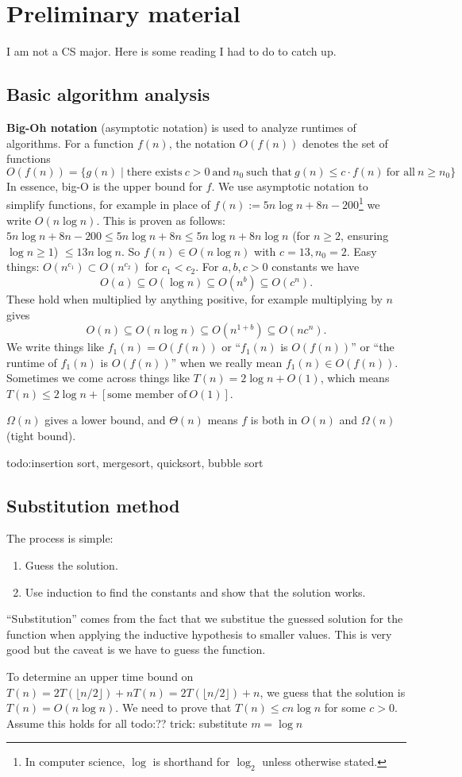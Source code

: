 \section{Preliminary material} 
I am not a CS major. Here is some reading I had to do to catch up.
\subsection{Basic algorithm analysis}
\textbf{Big-Oh notation} (asymptotic notation) is used to analyze runtimes of algorithms. For a function $f(n)$, the notation $O(f(n))$ denotes the set of functions \[
    O(f(n))= \{g(n) \mid \text{there exists} \ c>0 \ \text{and} \ n_0 \ \text{such that} \ g(n) \leq c \cdot f(n) \ \text{for all} \ n \geq n_0\} 
\] 
In essence, big-O is the upper bound for $f$. We use asymptotic notation to simplify functions, for example in place of $f(n):=5n \log n+8n -200$\footnote{In computer science, $\log$ is shorthand for $\log_2$ unless otherwise stated.} we write $O(n \log n)$. This is proven as follows: $5n \log n +8n-200 \leq 5n \log n + 8n \leq 5n \log n +8 n \log n$ (for $n\geq 2$, ensuring $\log n \geq 1$) $\leq 13 n \log n$. So $f(n) \in O(n \log n)$ with $c=13, n_0=2$. Easy things: $O(n ^{c_1}) \subset O (n ^{c_2})$ for $c_1 < c_2$. For $a,b,c>0$ constants we have \[
    O(a) \subseteq  O( \log n) \subseteq O(n^b) \subseteq O(c^n).
\] These hold when multiplied by anything positive, for example multiplying by $n$ gives \[
O(n) \subseteq O(n \log n) \subseteq O(n^{1+b}) \subseteq O(n c^n ).
\] We write things like $f_1(n)=O(f(n))$ or ``$f_1(n)$ is $O(f(n))$'' or ``the runtime of $f_1(n)$ is $O(f(n))$'' when we really mean $f_1(n) \in O(f(n))$. Sometimes we come across things like $T(n)=2 \log n +O(1)$, which means $T(n) \leq 2 \log n + [\text{some member of} \ O(1)]$.

$\Omega(n)$ gives a lower bound, and $\Theta(n)$ means $f$ is both in $O(n)$ and $\Omega(n)$ (tight bound).

{\color{red}todo:insertion sort, mergesort, quicksort, bubble sort} 

\subsection{Substitution method}
The process is simple:
\begin{enumerate}[label=(\arabic*)]
\setlength\itemsep{-.2em}
    \item Guess the solution.
    \item Use induction to find the constants and show that the solution works.
\end{enumerate}
``Substitution'' comes from the fact that we substitue the guessed solution for the function when applying the inductive hypothesis to smaller values. This is very good but the caveat is we have to guess the function.
\begin{example}
    To determine an upper time bound on $T(n)=2T(\lfloor n /2 \rfloor)+nT(n)=2T(\lfloor n /2 \rfloor)+n$, we guess that the solution is $T(n)=O(n \log n)$. We need to prove that $T(n) \leq cn \log n$ for some $c>0$. Assume this holds for all {\color{red}todo:??} trick: substitute $m=\log n$
\end{example}
